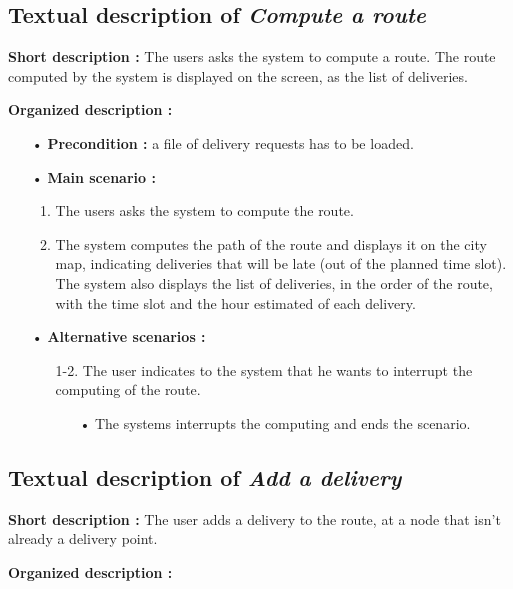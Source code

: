 \documentclass[paper=a4, fontsize=11pt]{report}
\numberwithin{equation}{section}		%
\numberwithin{figure}{section}		%
\numberwithin{table}{section}		%
\renewcommand{\it}[1]{\textit{#1}}
\begin{document}
\subsection{Textual description of \it{Compute a route}}
\label{subsec:textual-description-of-compute-a-route}

\textbf{Short description :} The users asks the system to compute a route. The route computed by the system is displayed on the screen, as the list of deliveries.

\textbf{Organized description :}

\begin{itemize}
  \item[•] \textbf{Precondition :} a file of delivery requests has to be loaded.
  \item[•] \textbf{Main scenario :}
  \begin{enumerate}
    \item The users asks the system to compute the route.
    \item The system computes the path of the route and displays it on the city map, indicating deliveries that will be late (out of the planned time slot). The system also displays the list of deliveries, in the order of the route, with the time slot and the hour estimated of each delivery.
  \end{enumerate}
  \item[•] \textbf{Alternative scenarios :}
  \begin{itemize}
    \item[1-2.] The user indicates to the system that he wants to interrupt the computing of the route.
    \begin{itemize}
      \item[•] The systems interrupts the computing and ends the scenario.
    \end{itemize}
  \end{itemize}
\end{itemize}

\subsection{Textual description of \it{Add a delivery}}
\label{subsec:textual-description-of-add-a-delivery}

\textbf{Short description :} The user adds a delivery to the route, at a node that isn’t already a delivery point.

\textbf{Organized description :}
\end{document}
